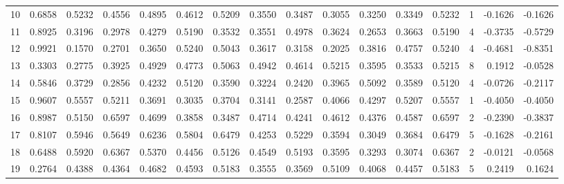 \begin{tabular}{lrrrrrrrrrrrrrrr}
10 &      0.6858 &  0.5232 &  0.4556 &  0.4895 &  0.4612 &  0.5209 &  0.3550 &  0.3487 &  0.3055 &  0.3250 &   0.3349 &     0.5232 &      1 &                   -0.1626 &                    -0.1626 \\
11 &      0.8925 &  0.3196 &  0.2978 &  0.4279 &  0.5190 &  0.3532 &  0.3551 &  0.4978 &  0.3624 &  0.2653 &   0.3663 &     0.5190 &      4 &                   -0.3735 &                    -0.5729 \\
12 &      0.9921 &  0.1570 &  0.2701 &  0.3650 &  0.5240 &  0.5043 &  0.3617 &  0.3158 &  0.2025 &  0.3816 &   0.4757 &     0.5240 &      4 &                   -0.4681 &                    -0.8351 \\
13 &      0.3303 &  0.2775 &  0.3925 &  0.4929 &  0.4773 &  0.5063 &  0.4942 &  0.4614 &  0.5215 &  0.3595 &   0.3533 &     0.5215 &      8 &                    0.1912 &                    -0.0528 \\
14 &      0.5846 &  0.3729 &  0.2856 &  0.4232 &  0.5120 &  0.3590 &  0.3224 &  0.2420 &  0.3965 &  0.5092 &   0.3589 &     0.5120 &      4 &                   -0.0726 &                    -0.2117 \\
15 &      0.9607 &  0.5557 &  0.5211 &  0.3691 &  0.3035 &  0.3704 &  0.3141 &  0.2587 &  0.4066 &  0.4297 &   0.5207 &     0.5557 &      1 &                   -0.4050 &                    -0.4050 \\
16 &      0.8987 &  0.5150 &  0.6597 &  0.4699 &  0.3858 &  0.3487 &  0.4714 &  0.4241 &  0.4612 &  0.4376 &   0.4587 &     0.6597 &      2 &                   -0.2390 &                    -0.3837 \\
17 &      0.8107 &  0.5946 &  0.5649 &  0.6236 &  0.5804 &  0.6479 &  0.4253 &  0.5229 &  0.3594 &  0.3049 &   0.3684 &     0.6479 &      5 &                   -0.1628 &                    -0.2161 \\
18 &      0.6488 &  0.5920 &  0.6367 &  0.5370 &  0.4456 &  0.5126 &  0.4549 &  0.5193 &  0.3595 &  0.3293 &   0.3074 &     0.6367 &      2 &                   -0.0121 &                    -0.0568 \\
19 &      0.2764 &  0.4388 &  0.4364 &  0.4682 &  0.4593 &  0.5183 &  0.3555 &  0.3569 &  0.5109 &  0.4068 &   0.4457 &     0.5183 &      5 &                    0.2419 &                     0.1624 \\
\bottomrule
\end{tabular}
